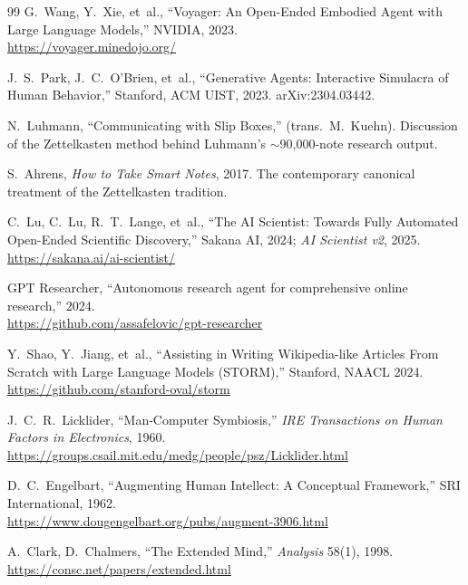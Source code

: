 \documentclass[12pt]{article}
\begin{document}
\begin{thebibliography}{99}
G.~Wang, Y.~Xie, et~al., ``Voyager: An Open-Ended Embodied Agent with Large Language Models,'' NVIDIA, 2023. \\
\url{https://voyager.minedojo.org/}

J.~S.~Park, J.~C.~O'Brien, et~al., ``Generative Agents: Interactive Simulacra of Human Behavior,'' Stanford, ACM UIST, 2023. arXiv:2304.03442.


N.~Luhmann, ``Communicating with Slip Boxes,'' (trans.\ M.~Kuehn). Discussion of the Zettelkasten method behind Luhmann's $\sim$90{,}000-note research output.

S.~Ahrens, \emph{How to Take Smart Notes}, 2017. The contemporary canonical treatment of the Zettelkasten tradition.


C.~Lu, C.~Lu, R.~T.~Lange, et~al., ``The AI Scientist: Towards Fully Automated Open-Ended Scientific Discovery,'' Sakana AI, 2024; \emph{AI Scientist v2}, 2025. \\
\url{https://sakana.ai/ai-scientist/}

GPT Researcher, ``Autonomous research agent for comprehensive online research,'' 2024. \\
\url{https://github.com/assafelovic/gpt-researcher}

Y.~Shao, Y.~Jiang, et~al., ``Assisting in Writing Wikipedia-like Articles From Scratch with Large Language Models (STORM),'' Stanford, NAACL 2024. \\
\url{https://github.com/stanford-oval/storm}


J.~C.~R.~Licklider, ``Man-Computer Symbiosis,'' \emph{IRE Transactions on Human Factors in Electronics}, 1960. \\
\url{https://groups.csail.mit.edu/medg/people/psz/Licklider.html}

D.~C.~Engelbart, ``Augmenting Human Intellect: A Conceptual Framework,'' SRI International, 1962. \\
\url{https://www.dougengelbart.org/pubs/augment-3906.html}

A.~Clark, D.~Chalmers, ``The Extended Mind,'' \emph{Analysis} 58(1), 1998. \\
\url{https://consc.net/papers/extended.html}


\end{thebibliography}
\end{document}
